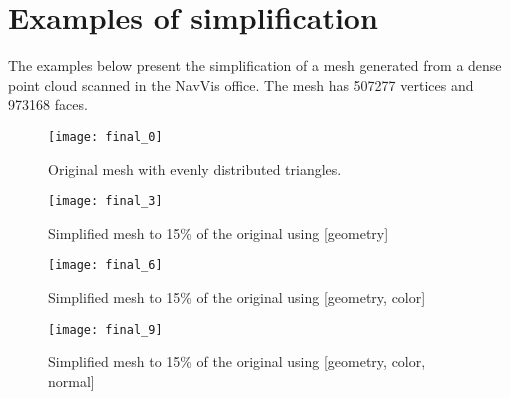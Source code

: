 \chapter{Examples of simplification}
\thispagestyle{empty}%

The examples below present the simplification of a mesh generated from a dense point cloud scanned in the NavVis office. The mesh has 507277 vertices and 973168 faces.

\begin{sidewaysfigure}[ht]
    \texttt{[image: final\_0]}
    \caption{Original mesh with evenly distributed triangles.}
    \label{fig:final_0}
\end{sidewaysfigure}

\newpage
\begin{sidewaysfigure}[ht]
    \texttt{[image: final\_3]}
    \caption{Simplified mesh to 15\% of the original using [geometry]}
    \label{fig:final_3}
\end{sidewaysfigure}

\newpage
\begin{sidewaysfigure}[ht]
    \texttt{[image: final\_6]}
    \caption{Simplified mesh to 15\% of the original using [geometry, color]}
    \label{fig:final_6}
\end{sidewaysfigure}

\newpage
\begin{sidewaysfigure}[ht]
    \texttt{[image: final\_9]}
    \caption{Simplified mesh to 15\% of the original using [geometry, color, normal]}
    \label{fig:final_9}
\end{sidewaysfigure}
